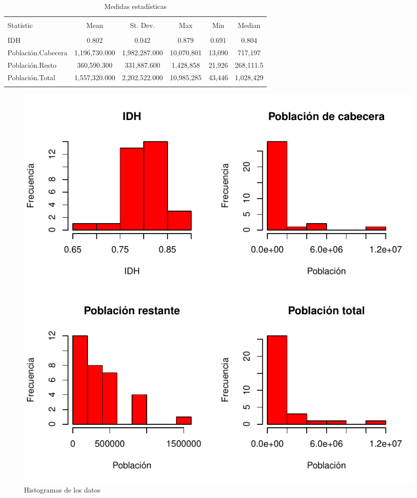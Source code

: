 \documentclass{article}
\begin{document}
\begin{table}[!htbp] \centering 
  \caption{Medidas estadísticas} 
  \label{stats} 
\begin{tabular}{@{\extracolsep{5pt}}lccccc} 
\\[-1.8ex]\hline 
\hline \\[-1.8ex] 
Statistic & \multicolumn{1}{c}{Mean} & \multicolumn{1}{c}{St. Dev.} & \multicolumn{1}{c}{Max} & \multicolumn{1}{c}{Min} & \multicolumn{1}{c}{Median} \\ 
\hline \\[-1.8ex] 
IDH & 0.802 & 0.042 & 0.879 & 0.691 & 0.804 \\ 
Población.Cabecera & 1,196,730.000 & 1,982,287.000 & 10,070,801 & 13,090 & 717,197 \\ 
Población.Resto & 360,590.300 & 331,887.600 & 1,428,858 & 21,926 & 268,111.5 \\ 
Población.Total & 1,557,320.000 & 2,202,522.000 & 10,985,285 & 43,446 & 1,028,429 \\ 
\hline \\[-1.8ex] 
\end{tabular} 
\end{table} 
\begin{figure}[h]
\centering
\includegraphics{ProyectoFinal-expUnivariadaGraficos}
\caption{Histogramas de los datos}
\label{histogramas}
\end{figure}
\end{document}

